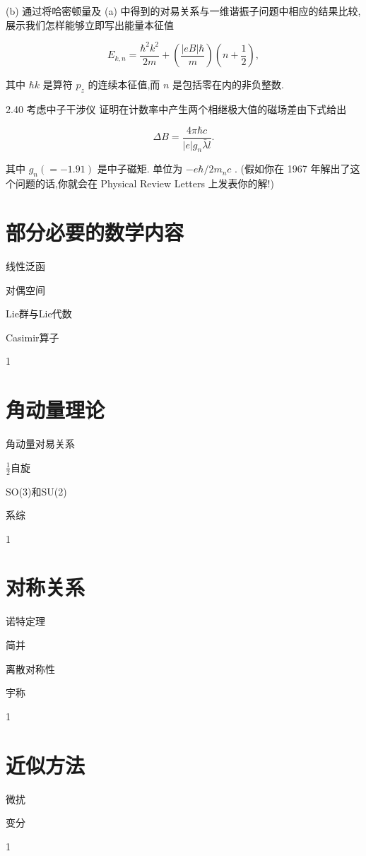 \documentclass[lang=cn,newtx,10pt,scheme=chinese,thmcnt=section]{elegantbook}
\begin{document}
(b) 通过将哈密顿量及 (a) 中得到的对易关系与一维谐振子问题中相应的结果比较, 展示我们怎样能够立即写出能量本征值

$$
{E}_{k, n} = \frac{{\hbar }^{2}{k}^{2}}{2m} + \left( \frac{\left| {eB}\right| \hbar }{m}\right) \left( {n + \frac{1}{2}}\right) ,
$$

其中 $\hbar k$ 是算符 ${p}_{z}$ 的连续本征值,而 $n$ 是包括零在内的非负整数.

2.40 考虑中子干涉仪
证明在计数率中产生两个相继极大值的磁场差由下式给出

$$
{\Delta B} = \frac{{4\pi }\hbar c}{\left| e\right| {g}_{n}\bar{\lambda }l}.
$$

其中 ${g}_{n}\left( { = - {1.91}}\right)$ 是中子磁矩. 单位为 $- e\hbar /2{m}_{n}c$ . (假如你在 1967 年解出了这个问题的话,你就会在 Physical Review Letters 上发表你的解!)


\chapter{部分必要的数学内容}
\begin{introduction}
	\item 线性泛函
	\item 对偶空间
	\item Lie群与Lie代数
	\item Casimir算子
\end{introduction}
1
\chapter{角动量理论}
\begin{introduction}
	\item 角动量对易关系
	\item $\frac12$自旋
	\item SO(3)和SU(2)
	\item 系综
\end{introduction}
1

\chapter{对称关系}
\begin{introduction}
	\item 诺特定理
	\item 简并
	\item 离散对称性
	\item 宇称
\end{introduction}
1

\chapter{近似方法}
\begin{introduction}
	\item 微扰
	\item 变分
\end{introduction}
1
\end{document}

